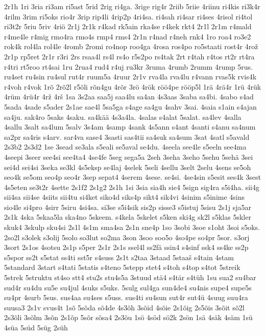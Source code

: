 {2r1h
1ri
3ria
ri3am
ri5ast
5rid
2rig
ri4ga.
3rige
rig4r
2riib
5riie
4riinu
ri4kis
ri3k4r
4rilm
3rim
ri5oks
rio4r
3rip
rip4li
4rip2p
4ri4sa.
ri4sah
ri4sar
ri4ses
4risol
ri4tol
ri3t2r
5riu
5riv
4riö
2r1j
2r1k
r4kad
rk5ain
rka4se
r4kek
rkt4
2r1l
2r1m
r4mald
r4me4le
r4mig
rmo4ra
rmo4s
rmp4
rms4
2r1n
r4nad
r4neh
rnk4
1ro
roa4
ro3e2
rok4k
rol4la
rol4le
4romb
2romi
ro4nop
roo4ga
4rosa
ros4po
ro5staati
rost4r
4rož
2r1p
rp5ret
2r1r
r3ri
2rs
rsaa4l
rs4l
rs4o
r5s2po
rs4tak
2rt
r4tah
r4tos
rt2r
rt4ra
r4tri
rt5roo
rt4sai
1ru
2rua4
rud4
r4uj
ru3kr
3ruma
4rumb
2rumm
4rump
5rus.
ru4set
ru4sin
ru4sul
rut4r
ruum5a
4ruur
2r1v
rva4la
rva4lu
r4vann
rvas5k
rvis4k
r4voh
r4vok
1rõ
2rõ2l
r5õli
rõn4gu
4rõr
3rö
4rök
röö4pe
rööp5l
1rä
4rä4r
1rü
4rük
4rüm
4rü4r
4rž
4rš
1sa
3s2aa
saa5j
saa4lu
sa4an
4s3aas
3saba
sa4bi.
4sabo
s4ad
5sada
4sade
s5ader
2s1ae
sae4l
5sa5ga
s4age
sa4gu
4sahv
3sai.
4saia
s1ain
s4ajan
sa4ju.
sak4ro
5saks
4saku.
sa4kää
4s3a4la.
4salas
s4alat
5salat.
sa4lev
4salla
4sallu
3salt
sa4lum
5salv
3s4am
4samp
4sank
4s5ann
s4ant
4santi
s4anu
sa4num
sa2pr
sa4ris
s4arv.
sar4va
sase4
3sasti
sas4tii
sa4suk
sa4sum
3sat
4satl
s5avald
2s3b2
2s3d2
1se
3sead
se3ala
s5eali
se5aval
se4du.
4seela
see4le
s5eeln
see4ma
4seepi
3seer
see4si
see4ta4
4se4fe
5seg
sega5a
2seh
3seha
3seho
5sehu
5sehä
3sei
sei4d
sei4si
3seka
se3kl
4s5eksp
se4laj
4selek
5seli
4sellu
3selt
2selu
4sens
se5oh
seo4k
se5om
seo4p
seo4r
3sep
sepat4
4serem
4sese.
se4si.
4se4sin
s5esit
ses4k
3sest
4s5eten
se3t2r
4sette
2s1f2
2s1g2
2s1h
1si
3sia
sia4h
sie4
5sign
sig4ra
s5i4ha.
sii4g
sii4sa
sii4se
4siits
sii4tu
si4ket
siko4d
siks4p
sikt4
sik4vi
4sinim
s5inime
4sins
sio4le
si4pro
4sirr
5siru
4si4sa.
si3se
s5i4sik
sis2p
sisse3
s5istuj
5sisu
2s1j
sja5ar
2s1k
4ska
5skaa5la
ska4no
5skeem.
s4kela
5skelet
s5ken
ski4g
sk2l
s5klas
5skler
skuk4
3skulp
sku4si
2s1l
4s1m
sma4sa
2s1n
sne4p
1so
3sobi
3soe
s1oht
3soi
s5oks.
2so2l
s3olek
s3olij
5solo
so3lut
so2ma
3son
3soo
soo5o
4so4pe
so4pr
5sor.
s3orj
3sort
2s1os
4sotsu
2s1p
s5per
2s1r
2s1s
ssel4l
ss2fä
ssin4
s4sinf
ssk4
ss4ke
ss2p
s5spor
ss2t
s5stat
ss4ti
sst5r
s4suss
2s1t
s2taa
3staad
5staaš
s4tain
4stam
5standard
3start
s4tati
5statis
s4teno
5stepp
stet4
s4toh
s4top
s4tot
5streik
5strek
5struktu
st4so
stt4
stu2s
stu4s5a
3stuud
stä4
s4tär
s4tüh
1su
sua2
su4bar
sud4r
su4du
su5e
su4jul
4suks
s5uks.
5sulg
sul4ga
sun4de4
su4nis
supe4
supe5s
su4pr
4surb
5sus.
sus4aa
su4ses
s5uss.
sus4ti
su4sun
sut4r
sut4ü
4suug
suu4ra
suusa3
2s1v
svus4t
1sõ
5sõda
sõ4de
4s3õh
3sõid
4sõie
2s1õig
2s5õis
3sõit
sõ2l
2s3õli
3sõlm
3sõn
2s1õp
5sõr
sõsa4
2s3õu
1sö
4söd
sö2k
2sön
1sä
4säk
4säm
1sü
4süa
5süd
5süg
2süh
}
